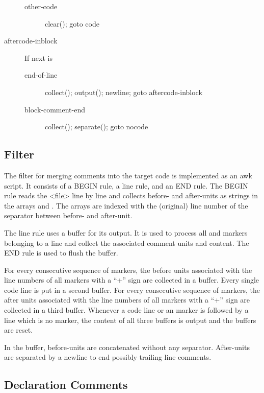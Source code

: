 \begin{description}
\begin{description}
  \item[other-code] clear(); goto code
  \end{description}
\item[aftercode-inblock] If next is
  \begin{description}
  \item[end-of-line] collect(); output(); newline; goto aftercode-inblock
  \item[block-comment-end] collect(); separate(); goto nocode
  \end{description}
\end{description}

\subsection{Filter }

The filter for merging comments into the target code is implemented as an awk script. It consists of a BEGIN rule, a line rule, and
an END rule. The BEGIN rule reads the <file> line by line and collects before- and after-units as strings in the arrays  and . The arrays are indexed with the (original) line number of the separator between before- and after-unit.

The line rule uses a buffer for its output. It is used to process all  and  markers belonging to
a line and collect the associated comment units and content. The END rule is used to flush the buffer.

For every consecutive sequence of  markers, the before units associated with the line numbers of all markers with 
a ``+'' sign are collected in a buffer. Every single code line is put in a second buffer. For every consecutive sequence of
 markers, the after units associated with the line numbers of all markers with 
a ``+'' sign are collected in a third buffer. Whenever a code line or an  marker is followed by a line which 
is no  marker, the content of all three buffers is output and the buffers are reset.

In the buffer, before-units are concatenated without any separator. After-units are separated by a newline to end possibly 
trailing line comments.





\subsection{Declaration Comments}

